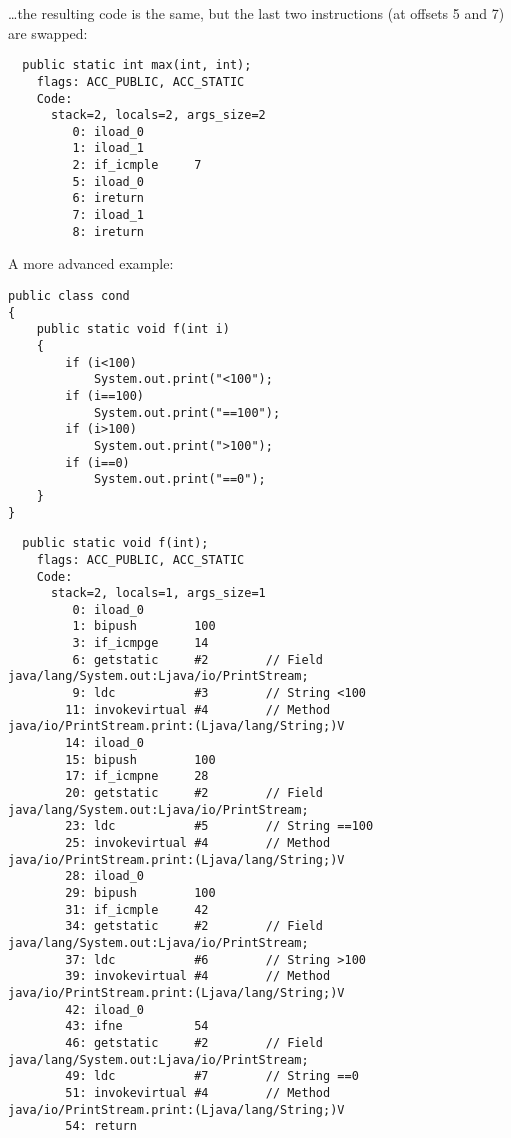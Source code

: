 \dots the resulting code is the same, but the last two  instructions 
(at offsets 5 and 7) are swapped:


\begin{lstlisting}
  public static int max(int, int);
    flags: ACC_PUBLIC, ACC_STATIC
    Code:
      stack=2, locals=2, args_size=2
         0: iload_0       
         1: iload_1       
         2: if_icmple     7
         5: iload_0       
         6: ireturn       
         7: iload_1       
         8: ireturn       
\end{lstlisting}

A more advanced example:

\begin{lstlisting}[style=customjava]
public class cond
{
	public static void f(int i)
	{
		if (i<100)
			System.out.print("<100");
		if (i==100)
			System.out.print("==100");
		if (i>100)
			System.out.print(">100");
		if (i==0)
			System.out.print("==0");
	}
}
\end{lstlisting}

\begin{lstlisting}
  public static void f(int);
    flags: ACC_PUBLIC, ACC_STATIC
    Code:
      stack=2, locals=1, args_size=1
         0: iload_0       
         1: bipush        100
         3: if_icmpge     14
         6: getstatic     #2        // Field java/lang/System.out:Ljava/io/PrintStream;
         9: ldc           #3        // String <100
        11: invokevirtual #4        // Method java/io/PrintStream.print:(Ljava/lang/String;)V
        14: iload_0       
        15: bipush        100
        17: if_icmpne     28
        20: getstatic     #2        // Field java/lang/System.out:Ljava/io/PrintStream;
        23: ldc           #5        // String ==100
        25: invokevirtual #4        // Method java/io/PrintStream.print:(Ljava/lang/String;)V
        28: iload_0       
        29: bipush        100
        31: if_icmple     42
        34: getstatic     #2        // Field java/lang/System.out:Ljava/io/PrintStream;
        37: ldc           #6        // String >100
        39: invokevirtual #4        // Method java/io/PrintStream.print:(Ljava/lang/String;)V
        42: iload_0       
        43: ifne          54
        46: getstatic     #2        // Field java/lang/System.out:Ljava/io/PrintStream;
        49: ldc           #7        // String ==0
        51: invokevirtual #4        // Method java/io/PrintStream.print:(Ljava/lang/String;)V
        54: return        
\end{lstlisting}

